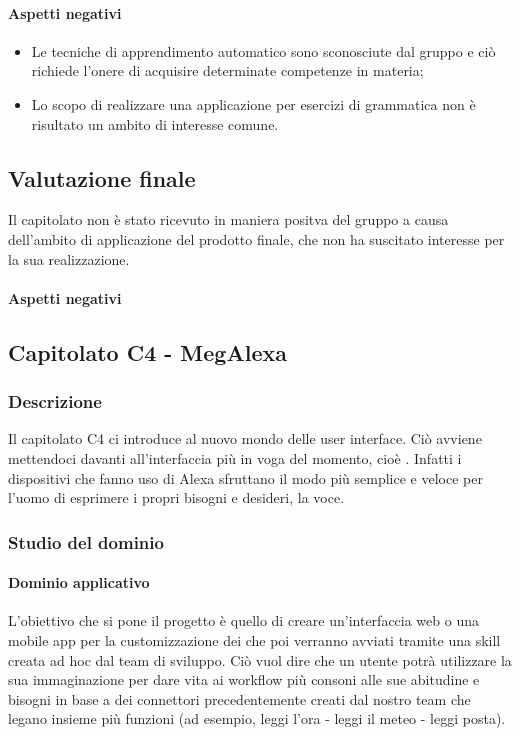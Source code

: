 		\paragraph{Aspetti negativi} 
		\begin{itemize}
			\item {Le tecniche di apprendimento automatico sono sconosciute dal gruppo e ciò richiede l'onere di acquisire determinate competenze in materia;}
			\item {Lo scopo di realizzare una applicazione per esercizi di grammatica non è risultato un ambito di interesse comune.}
		\end{itemize} 
	\subsection{Valutazione finale}
	Il capitolato non è stato ricevuto in maniera positva del gruppo a causa dell'ambito di applicazione del prodotto finale, che non ha suscitato interesse per la sua realizzazione.
	
	\paragraph{Aspetti negativi} 
	
	\subsection{Capitolato C4 - MegAlexa}
	\subsubsection{Descrizione}	
		Il capitolato C4 ci introduce al nuovo mondo delle user interface. Ciò avviene mettendoci davanti all’interfaccia più in voga del momento, cioè . Infatti i dispositivi che fanno uso di Alexa sfruttano il modo più semplice e veloce per l’uomo di esprimere i propri bisogni e desideri, la voce. 
	\subsubsection{Studio del dominio}
	
	\paragraph{Dominio applicativo} \Spazio
     L’obiettivo che si pone il progetto è quello di creare un’interfaccia web o una mobile app per la customizzazione dei  che poi verranno avviati tramite una skill creata ad hoc dal team di sviluppo.
     Ciò vuol dire che un utente potrà utilizzare la sua immaginazione per dare vita ai workflow più consoni alle sue abitudine e bisogni in base a dei connettori precedentemente creati dal nostro team che legano insieme più funzioni (ad esempio, leggi l'ora - leggi il meteo - leggi posta).
